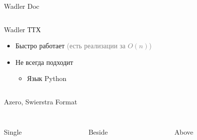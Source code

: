\documentclass[sans]{beamer}
\begin{document}
\begin{frame}{Wadler Doc}
  \inputminted{hs}{codes/wadlerDoc.hs}
\end{frame}

\begin{frame}{Wadler ТТХ}
  \begin{itemize}
    \item Быстро работает \textcolor{gray}{(есть реализации за $O(n)$)}
    \item Не всегда подходит
    \begin{itemize}
      \item Язык Python
        \inputminted{py}{codes/wadlerSeq.py}
    \end{itemize}
  \end{itemize}
\end{frame}

\begin{frame}{Azero, Swierstra Format}
  \inputminted{hs}{codes/swierstraFormat.hs}

  \vspace{0.2cm}

  \begin{columns}
    \begin{column}{0.3\linewidth}
      \centering
    \end{column}
    
    \begin{column}{0.3\linewidth}
      \centering
    \end{column}

    \begin{column}{0.3\linewidth}
      \centering
    \end{column}
  \end{columns}

  \vspace{0.2cm}

  \begin{columns}
    \begin{column}{0.3\linewidth}
      \centering
      \scriptsize
      Single
    \end{column}
    \begin{column}{0.3\linewidth}
      \centering
      \scriptsize
      Beside
    \end{column}
    \begin{column}{0.3\linewidth}
      \centering
      \scriptsize
      Above
    \end{column}

  \end{columns}
\end{frame}
\end{document}

